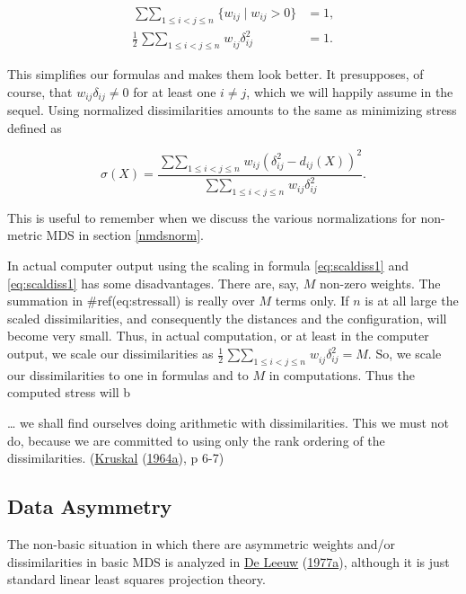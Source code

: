 \documentclass[
  12pt,
]{book}
\theoremstyle{definition}
\theoremstyle{definition}
\theoremstyle{definition}
\theoremstyle{definition}
\theoremstyle{remark}
\begin{document}
\begin{align}
\mathop{\sum\sum}_{1\leq i<j\leq n}\{w_{ij}\mid w_{ij}>0\}&=1,\label{eq:scaldiss1}\\
\frac12\mathop{\sum\sum}_{1\leq i<j\leq n} w_{ij}^{\ }\delta_{ij}^2&=1.\label{eq:scaldiss2}
\end{align}

This simplifies our formulas and makes them look better. It presupposes, of course, that \(w_{ij}\delta_{ij}\not=0\) for at least one \(i\not= j\), which we will happily assume in the sequel. Using normalized dissimilarities amounts to the same as minimizing stress defined as

\begin{equation}
\sigma(X)=\frac{\mathop{\sum\sum}_{1\leq i<j\leq n}w_{ij}(\delta_{ij}^2-d_{ij}(X))^2}{\mathop{\sum\sum}_{1\leq i<j\leq n}w_{ij}\delta_{ij}^2}.
\label{eq:stressrat}
\end{equation}

This is useful to remember when we discuss the various normalizations for non-metric MDS in section \ref{nmdsnorm}.

In actual computer output using the scaling in formula \eqref{eq:scaldiss1} and \eqref{eq:scaldiss1} has some disadvantages. There are, say, \(M\) non-zero weights. The summation in \#ref(eq:stressall) is really over \(M\) terms only. If \(n\) is at all large the scaled dissimilarities, and consequently the distances and the configuration, will become very small. Thus, in actual computation, or at least in the computer output, we scale our dissimilarities as \(\frac12\mathop{\sum\sum}_{1\leq i<j\leq n} w_{ij}^{\ }\delta_{ij}^2=M\). So, we scale our dissimilarities to one in formulas and to \(M\) in computations. Thus the computed stress will b

\ldots{} we shall find ourselves doing arithmetic with dissimilarities. This we must not do, because we are committed to using only the rank ordering of the dissimilarities. (\protect\hyperlink{ref-kruskal_64a}{Kruskal} (\protect\hyperlink{ref-kruskal_64a}{1964a}), p 6-7)

\hypertarget{datasym}{%
\subsection{Data Asymmetry}\label{datasym}}

The non-basic situation in which there are asymmetric weights and/or
dissimilarities in basic MDS is analyzed in \protect\hyperlink{ref-deleeuw_C_77}{De Leeuw} (\protect\hyperlink{ref-deleeuw_C_77}{1977a}),
although it is just standard linear least squares projection theory.
\end{document}
